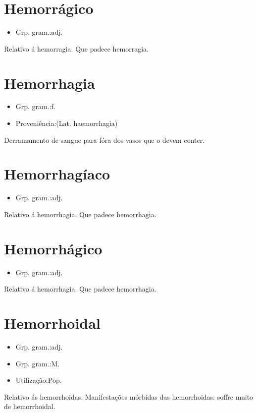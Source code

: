 \documentclass{article}
\begin{document}
\section{Hemorrágico}
\begin{itemize}
\item {Grp. gram.:adj.}
\end{itemize}
Relativo á hemorragia.
Que padece hemorragia.
\section{Hemorrhagia}
\begin{itemize}
\item {Grp. gram.:f.}
\end{itemize}
\begin{itemize}
\item {Proveniência:(Lat. \textunderscore haemorrhagia\textunderscore )}
\end{itemize}
Derramamento de sangue para fóra dos vasos que o devem conter.
\section{Hemorrhagíaco}
\begin{itemize}
\item {Grp. gram.:adj.}
\end{itemize}
Relativo á hemorrhagia.
Que padece hemorrhagia.
\section{Hemorrhágico}
\begin{itemize}
\item {Grp. gram.:adj.}
\end{itemize}
Relativo á hemorrhagia.
Que padece hemorrhagia.
\section{Hemorrhoidal}
\begin{itemize}
\item {Grp. gram.:adj.}
\end{itemize}
\begin{itemize}
\item {Grp. gram.:M.}
\end{itemize}
\begin{itemize}
\item {Utilização:Pop.}
\end{itemize}
Relativo ás hemorrhoidas.
Manifestações mórbidas das hemorrhoidas: \textunderscore soffre muito de hemorrhoidal\textunderscore .
\end{document}
